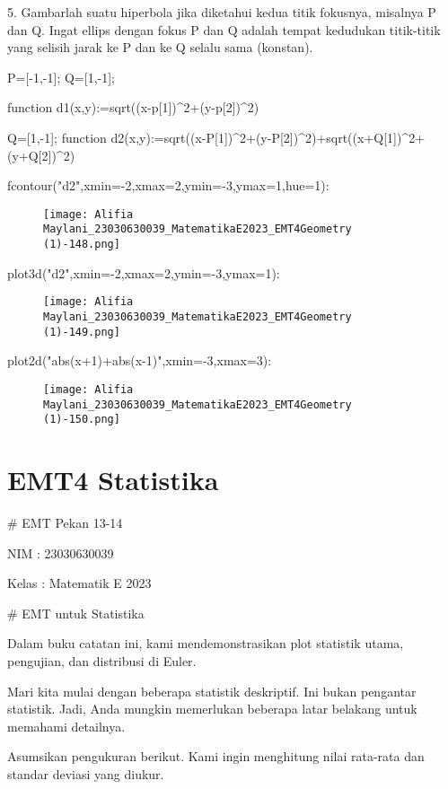 \documentclass{article}
\begin{document}
5. Gambarlah suatu hiperbola jika diketahui kedua titik fokusnya,
misalnya P dan Q. Ingat ellips dengan fokus P dan Q adalah tempat
kedudukan titik-titik yang selisih jarak ke P dan ke Q selalu sama
(konstan).


\>P=[-1,-1]; Q=[1,-1];

\>function d1(x,y):=sqrt((x-p[1])^2+(y-p[2])^2)

\>Q=[1,-1]; function d2(x,y):=sqrt((x-P[1])^2+(y-P[2])^2)+sqrt((x+Q[1])^2+(y+Q[2])^2)

\>fcontour("d2",xmin=-2,xmax=2,ymin=-3,ymax=1,hue=1):


\begin{figure}
    \centering
    \texttt{[image: Alifia Maylani\_23030630039\_MatematikaE2023\_EMT4Geometry (1)-148.png]}
    \caption{}
    \label{fig:enter-label}
\end{figure}

\>plot3d("d2",xmin=-2,xmax=2,ymin=-3,ymax=1):


\begin{figure}
    \centering
    \texttt{[image: Alifia Maylani\_23030630039\_MatematikaE2023\_EMT4Geometry (1)-149.png]}
    \caption{}
    \label{fig:enter-label}
\end{figure}

\>plot2d("abs(x+1)+abs(x-1)",xmin=-3,xmax=3):


\begin{figure}
    \centering
    \texttt{[image: Alifia Maylani\_23030630039\_MatematikaE2023\_EMT4Geometry (1)-150.png]}
    \caption{}
    \label{fig:enter-label}
\end{figure}

\section{EMT4 Statistika}
# EMT Pekan 13-14


NIM : 23030630039


Kelas : Matematik E 2023


# EMT untuk Statistika

Dalam buku catatan ini, kami mendemonstrasikan plot statistik utama,
pengujian, dan distribusi di Euler.


Mari kita mulai dengan beberapa statistik deskriptif. Ini bukan
pengantar statistik. Jadi, Anda mungkin memerlukan beberapa latar
belakang untuk memahami detailnya.


Asumsikan pengukuran berikut. Kami ingin menghitung nilai rata-rata
dan standar deviasi yang diukur.
\end{document}
